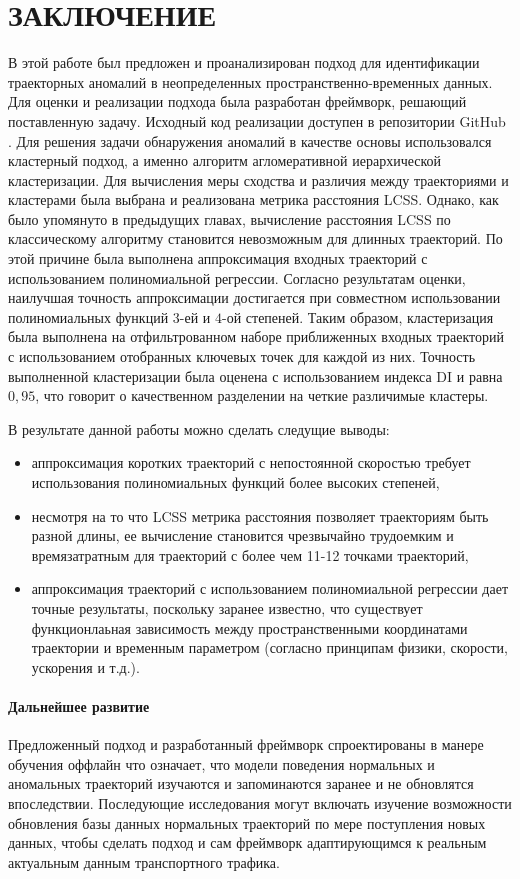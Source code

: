 \chapter{ЗАКЛЮЧЕНИЕ}
\label{ch:ЗАКЛЮЧЕНИЕ}

В этой работе был предложен и проанализирован подход для идентификации траекторных аномалий в неопределенных пространственно-временных данных. Для оценки и реализации подхода была разработан фреймворк, решающий поставленную задачу. Исходный код реализации доступен в репозитории GitHub \cite{online:mt_anomalies}. Для решения задачи обнаружения аномалий в качестве основы использовался кластерный подход, а именно алгоритм агломеративной иерархической кластеризации. Для вычисления меры сходства и различия между траекториями и кластерами была выбрана и реализована метрика расстояния LCSS. Однако, как было упомянуто в предыдущих главах, вычисление расстояния LCSS по классическому алгоритму становится невозможным для длинных траекторий. По этой причине была выполнена аппроксимация входных траекторий с использованием полиномиальной регрессии. Согласно результатам оценки, наилучшая точность аппроксимации достигается при совместном использовании полиномиальных функций $3$-ей и $4$-ой степеней. Таким образом, кластеризация была выполнена на отфильтрованном наборе приближенных входных траекторий с использованием отобранных ключевых точек для каждой из них. Точность выполненной кластеризации была оценена с использованием индекса DI и равна $0,95$, что говорит о качественном разделении на четкие различимые кластеры.

В результате данной работы можно сделать следущие выводы:
\begin{itemize}
	\item аппроксимация коротких траекторий с непостоянной скоростью требует использования полиномиальных функций более высоких степеней,
	\item несмотря на то что LCSS метрика расстояния позволяет траекториям быть разной длины, ее вычисление становится чрезвычайно трудоемким и времязатратным  для траекторий с более чем 11-12 точками траекторий,
	\item аппроксимация траекторий с использованием полиномиальной регрессии дает точные результаты, поскольку заранее известно, что существует функционлаьная зависимость между пространственными координатами траектории и временным параметром (согласно принципам физики, скорости, ускорения и т.д.).
	
\end{itemize}

\bigbreak

\subsubsection{Дальнейшее развитие}

Предложенный подход и разработанный фреймворк спроектированы в манере обучения оффлайн что означает, что модели поведения нормальных и аномальных траекторий изучаются и запоминаются заранее и не обновлятся впоследствии. Последующие исследования могут включать изучение возможности обновления базы данных нормальных траекторий по мере поступления новых данных, чтобы сделать подход и сам фреймворк адаптирующимся к реальным актуальным данным транспортного трафика.
